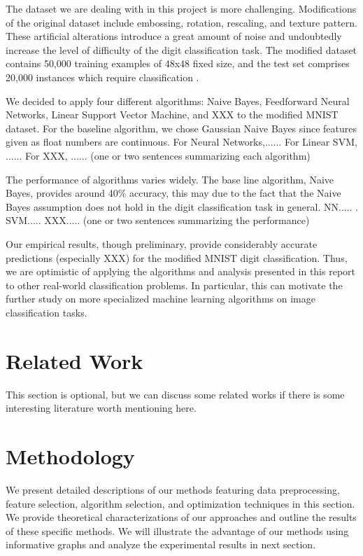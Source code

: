 \documentclass{acm_proc_article-sp}
\begin{document}
The dataset we are dealing with in this project is more challenging. Modifications of the original dataset include embossing, rotation, rescaling, and texture pattern. These artificial alterations introduce a great amount of noise and undoubtedly increase the  level of difficulty of the digit classification task. The modified dataset contains 50,000 training examples of 48x48 fixed size, and the test set comprises 20,000 instances which require classification \cite{comp598p3}.

We decided to apply four different algorithms: Naive Bayes, Feedforward Neural Networks, Linear Support Vector Machine, and XXX to the modified MNIST dataset. For the baseline algorithm, we chose Gaussian Naive Bayes since features given as float numbers are continuous.  For Neural Networks,......  For Linear SVM, ......  For XXX, ...... (one or two sentences summarizing each algorithm)

The performance of algorithms varies widely. The base line algorithm, Naive Bayes, provides around 40$\%$ accuracy, this may due to the fact that the Naive Bayes assumption does not hold in the digit classification task in general. NN..... . SVM..... XXX..... (one or two sentences summarizing the performance)

Our empirical results, though preliminary, provide considerably accurate predictions (especially XXX) for the modified MNIST digit classification. Thus, we are optimistic of applying the algorithms and analysis presented in this report to other real-world  classification problems. In particular, this can motivate the further study on more specialized machine learning algorithms on image classification tasks.

\section{Related Work}
This section is optional, but we can discuss some related works if there is some interesting literature worth mentioning here.








\section{Methodology}
We present detailed descriptions of our methods featuring data preprocessing, feature selection, algorithm selection, and optimization techniques in this section.  We provide theoretical characterizations of our approaches and outline the results of these specific methods. We will illustrate the advantage of our methods using informative graphs and analyze the experimental results in next section.
\end{document}
